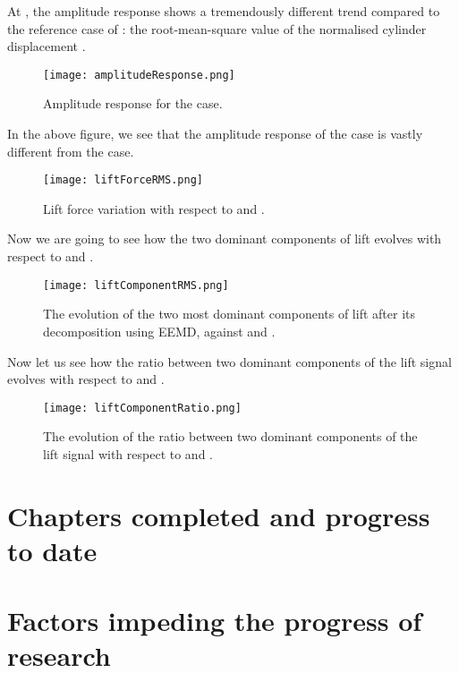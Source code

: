 \documentclass[a4paper]{article}
\begin{document}
At \ptlt{}\es{}\rze{}, the amplitude response shows a tremendously different trend compared to the reference case of \ptlt{}\es{}\rfo{}: the root-mean-square value of the normalised cylinder displacement \yrms{}. 

\begin{figure}[h]
  \centering
  \texttt{[image: amplitudeResponse.png]}
  \caption{Amplitude response for the \rze{} case.}
  \label{fig:ampresp}
\end{figure}

In the above figure, we see that the amplitude response of the \rze{} case is vastly different from the \rfo{} case.
\newpage

\begin{figure}[h]
  \centering
  \texttt{[image: liftForceRMS.png]}
  \caption{Lift force variation with respect to \ured{} and \ptlt{}.}
  \label{fig:liftevo}
\end{figure}

Now we are going to see how the two dominant components of lift evolves with respect to \ured{} and \ptlt{}.

\begin{figure}[h]
  \centering
  \texttt{[image: liftComponentRMS.png]}
  \caption{The evolution of the two most dominant components of lift after its decomposition using EEMD, against \ured{} and \ptlt{}.}
  \label{fig:liftcomp}
\end{figure}

Now let us see how the ratio between two dominant components of the lift signal evolves with respect to \ured{} and \ptlt{}.

\begin{figure}[h]
  \centering
  \texttt{[image: liftComponentRatio.png]}
  \caption{The evolution of the ratio between two dominant components of the lift signal with respect to \ured{} and \ptlt{}.}
  \label{fig:liftcomprat}
\end{figure}

\newpage

\section{Chapters completed and progress to date}

\section{Factors impeding the progress of research}

\printbibliography
\end{document}
